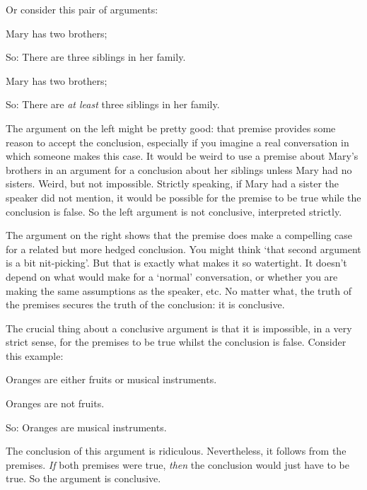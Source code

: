 Or consider this pair of arguments:

	\begin{minipage}{0.45\textwidth}
\begin{earg}
	\item [] Mary has two brothers;
		\item[So:] There are three siblings in her family. 
	\end{earg}\end{minipage}\qquad\begin{minipage}{0.45\textwidth}
		\begin{earg}
		\item [] Mary has two brothers;
		\item[So:] There are \emph{at least} three siblings in her family. 
	\end{earg}
	\end{minipage}

The argument on the left might be pretty good: that premise provides some reason to accept the conclusion, especially if you imagine a real conversation in which someone makes this case. It would be weird to use a premise about Mary's brothers in an argument for a conclusion about her siblings unless Mary had no sisters. Weird, but not impossible. Strictly speaking, if Mary had a sister the speaker did not mention, it would be possible for the premise to be true while the conclusion is false. So the left argument is not conclusive, interpreted strictly.

The argument on the right shows that the premise does make a compelling case for a related but more hedged conclusion. You might think `that second argument is a bit nit-picking'. But that is exactly what makes it so watertight.  It doesn't depend on what would make for a `normal' conversation, or whether you are making the same assumptions as the speaker, etc. No matter what, the truth of the premises secures the truth of the conclusion: it is conclusive.

The crucial thing about a conclusive argument is that it is impossible, in a very strict sense, for the premises to be true whilst the conclusion is false. Consider this example:
	\begin{earg}
		\item[] Oranges are either fruits or musical instruments.
		\item[] Oranges are not fruits.
		\item[So:] Oranges are musical instruments.
	\end{earg}
The conclusion of this argument is ridiculous. Nevertheless, it follows from the premises. \emph{If} both premises were true, \emph{then} the conclusion would just have to be true. So the argument is conclusive. 

